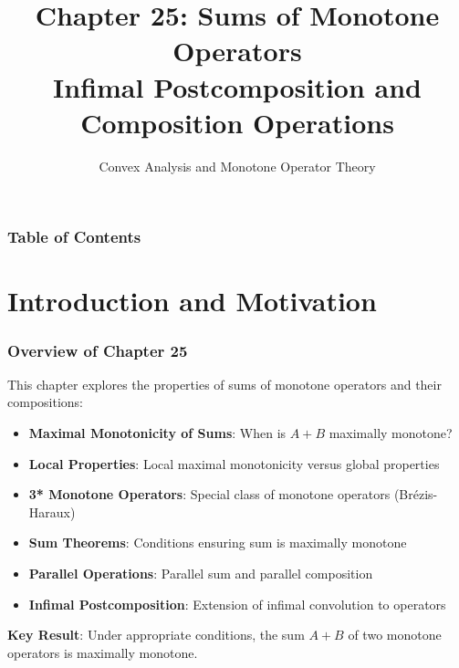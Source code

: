 \documentclass[aspectratio=169,10pt]{beamer}
\title[Sums of Monotone Operators]{Chapter 25: Sums of Monotone Operators \\ Infimal Postcomposition and Composition Operations}
\author{Convex Analysis and Monotone Operator Theory}
\institute{Based on Bauschke \& Combettes (2017)}
\date{}
\begin{document}
\frame{\titlepage}

\begin{frame}
  \frametitle{Table of Contents}
  \tableofcontents[hideallsubsections]
\end{frame}

\section{Introduction and Motivation}

\begin{frame}
  \frametitle{Overview of Chapter 25}

  This chapter explores the properties of sums of monotone operators and their compositions:

  \begin{itemize}
    \item \textbf{Maximal Monotonicity of Sums}: When is $A + B$ maximally monotone?
    \item \textbf{Local Properties}: Local maximal monotonicity versus global properties
    \item \textbf{3* Monotone Operators}: Special class of monotone operators (Brézis-Haraux)
    \item \textbf{Sum Theorems}: Conditions ensuring sum is maximally monotone
    \item \textbf{Parallel Operations}: Parallel sum and parallel composition
    \item \textbf{Infimal Postcomposition}: Extension of infimal convolution to operators
  \end{itemize}

  \vspace{0.3cm}

  \textbf{Key Result}: Under appropriate conditions, the sum $A + B$ of two monotone operators is maximally monotone.

\end{frame}
\end{document}

